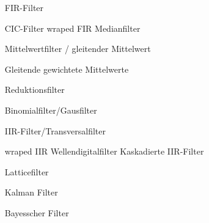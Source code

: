 \documentclass[a4paper,11pt]{article}
\begin{document}
\begin{itemize}
\item[FIR-Filter]

	\subitem CIC-Filter
	\subitem wraped FIR
	\subitem Medianfilter

	\subitem Mittelwertfilter / gleitender Mittelwert

	\subitem Gleitende gewichtete Mittelwerte

	\subitem Reduktionsfilter

	\subitem Binomialfilter/Gausfilter

\item[IIR-Filter/Transversalfilter]

	\subitem wraped IIR
	\subitem Wellendigitalfilter
	\subitem Kaskadierte IIR-Filter

\item[Latticefilter]


\item[Kalman Filter]

\item[Bayesscher Filter]

\end{itemize}
		
\end{document}
